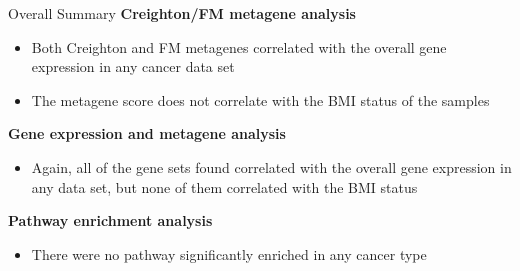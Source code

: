 \documentclass[handout]{beamer}
\begin{document}
\begin{frame}{Overall Summary}
	\textbf{Creighton/FM metagene analysis}
	\begin{itemize}
		\item Both Creighton and FM metagenes correlated with the overall gene expression in any cancer data set
		\item The metagene score does not correlate with the BMI status of the samples
	\end{itemize}
	\textbf{Gene expression and metagene analysis}
	\begin{itemize}
		\item Again, all of the gene sets found correlated with the overall gene expression in any data set, but none of them correlated with the BMI status
	\end{itemize}
	\textbf{Pathway enrichment analysis}
	\begin{itemize}
		\item There were no pathway significantly enriched in any cancer type
	\end{itemize}
\end{frame}


\end{document}

